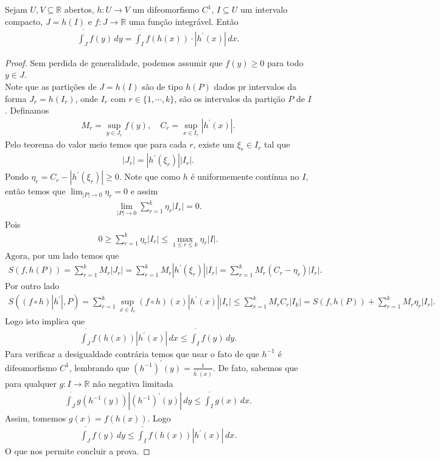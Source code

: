 \begin{theorem}
  Sejam $U,V\subseteq\mathbb{R}$ abertos, $h:U\to V$ um difeomorfismo $C^{1}$, $I\subseteq U$ um intervalo compacto, $J=h(I)$ e $f:J\to\mathbb{R}$ uma função integrável. Então
  \begin{align*}
    \overline{\int_{J}}f(y)\,dy=\overline{\int_{I}}f(h(x))\cdot |h^{\prime}(x)|\,dx.
  \end{align*}
\end{theorem}
\begin{proof} 
  Sem perdida de generalidade, podemos assumir que $f(y)\geq 0$ para todo $y\in J$.\\
  Note que as partições de $J=h(I)$ são de tipo $h(P)$ dados pr intervalos da forma $J_r=h(I_r)$, onde $I_r$ com $r\in\{1,\cdots,k\}$, são os intervalos da partição $P$ de $I$. Definamos
  \begin{align*}
    M_r=\sup_{y\in J_r}f(y),\quad C_r=\sup_{x\in I_r}|h^{\prime}(x)|.
  \end{align*}
  Pelo teorema do valor meio temos que para cada $r$, existe um $\xi_r\in I_r$ tal que
  \begin{align*}
    |J_r|=|h^{\prime}(\xi_r)||I_r|.
  \end{align*}
  Pondo $\eta_r=C_r-|h^{\prime}(\xi_r)|\geq 0$. Note que como $h$ é uniformemente contínua no $I$, então temos que $\lim_{|P| \to 0}\eta_r=0$ e assim
  \begin{align*}
    \lim_{|P| \to 0}\sum_{r=1}^{k}\eta_r|I_r|=0.
  \end{align*}
  Pois
  \begin{align*}
    0\geq \sum_{r=1}^{k}\eta_{r}|I_r|\leq \max_{1\leq r\leq k}\eta_{r}|I|.
  \end{align*}
  Agora, por um lado temos que 
  \begin{align*}
    S(f,h(P))=\sum_{r=1}^{k}M_r|J_r|=\sum_{r=1}^{k}M_r|h^{\prime}(\xi_{r})||I_r|=\sum_{r=1}^{k}M_r(C_r-\eta_r)|I_r|.
  \end{align*}
  Por outro lado
  \begin{align*}
    S((f\circ h)|h^{\prime}|,P)=\sum_{r=1}^{k}\sup_{x\in I_r}(f\circ h)(x)|h^{\prime}(x)||I_r|\leq \sum_{r=1}^{k}M_rC_r|I_k|=S(f,h(P))+\sum_{r=1}^{k}M_r\eta_r|I_r|.
  \end{align*}
  Logo isto implica que
  \begin{align*}
    \overline{\int_{J}}f(h(x))|h^{\prime}(x)|\,dx\leq \overline{\int_{I}}f(y)\,dy.
  \end{align*}
  Para verificar a desigualdade contrária temos que usar o fato de que $h^{-1}$ é difeomorfismo $C^{1}$, lembrando que $(h^{-1})^{\prime}(y)=\frac{1}{h^{\prime}(x)}$. De fato, sabemos que para qualquer $g:I\to\mathbb{R}$ não negativa limitada
  \begin{align*}
    \overline{\int_{J}}g(h^{-1}(y))|(h^{-1})^{\prime}(y)|\,dy\leq\overline{\int_{I}}g(x)\,dx.
  \end{align*}
  Assim, tomemos $g(x)=f(h(x))$. Logo
  \begin{align*}
    \overline{\int_{J}}f(y)\,dy\leq \overline{\int_{I}}f(h(x))|h^{\prime}(x)|\,dx.
  \end{align*}
  O que nos permite concluir a prova.
\end{proof}

